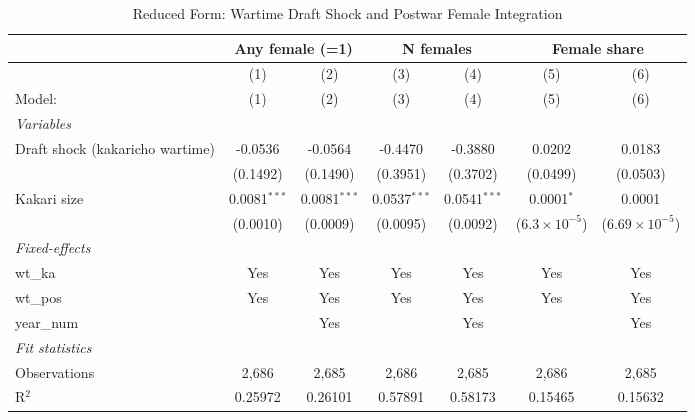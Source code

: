 \begin{table}[htbp]
\centering
\caption{Reduced Form: Wartime Draft Shock and Postwar Female Integration}
\label{tab:reduced-form-female}
\small
\begin{threeparttable}
\begin{tabular}{lcccccc}
   \tabularnewline \midrule \midrule
 & \multicolumn{2}{c}{Any female (=1)} & \multicolumn{2}{c}{N females} & \multicolumn{2}{c}{Female share} \\
\midrule
                                   & (1)            & (2)            & (3)            & (4)            & (5)                    & (6) \\   
   Model:                          & (1)            & (2)            & (3)            & (4)            & (5)                    & (6)\\  
   \midrule
   \emph{Variables}\\
   Draft shock (kakaricho wartime) & -0.0536        & -0.0564        & -0.4470        & -0.3880        & 0.0202                 & 0.0183\\   
                                   & (0.1492)       & (0.1490)       & (0.3951)       & (0.3702)       & (0.0499)               & (0.0503)\\   
   Kakari size                     & 0.0081$^{***}$ & 0.0081$^{***}$ & 0.0537$^{***}$ & 0.0541$^{***}$ & 0.0001$^{*}$           & 0.0001\\   
                                   & (0.0010)       & (0.0009)       & (0.0095)       & (0.0092)       & ($6.3\times 10^{-5}$)  & ($6.69\times 10^{-5}$)\\    
   \midrule
   \emph{Fixed-effects}\\
   wt\_ka                          & Yes            & Yes            & Yes            & Yes            & Yes                    & Yes\\  
   wt\_pos                         & Yes            & Yes            & Yes            & Yes            & Yes                    & Yes\\  
   year\_num                       &                & Yes            &                & Yes            &                        & Yes\\  
   \midrule
   \emph{Fit statistics}\\
   Observations                    & 2,686          & 2,685          & 2,686          & 2,685          & 2,686                  & 2,685\\  
   R$^2$                           & 0.25972        & 0.26101        & 0.57891        & 0.58173        & 0.15465                & 0.15632\\  

\end{tabular}
\end{threeparttable}
\end{table}
